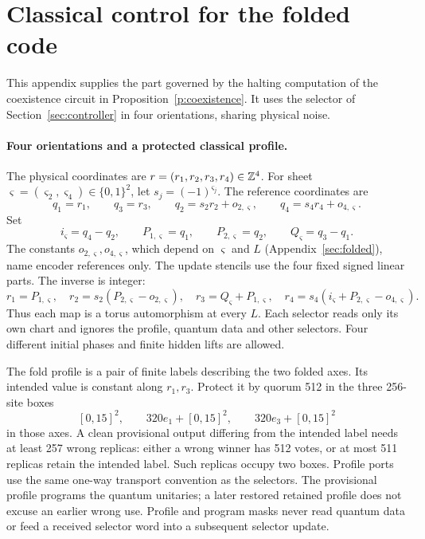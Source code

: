 \section{Classical control for the folded code}\label{sec:fold-controls}
This appendix supplies the part governed by the halting computation of the coexistence circuit
in Proposition~\ref{p:coexistence}. It uses the selector of
Section~\ref{sec:controller} in four orientations, sharing physical noise.

\paragraph{Four orientations and a protected classical profile.}
The physical coordinates are \(r=(r_1,r_2,r_3,r_4)\in\mathbb Z^4\).
For sheet \(\varsigma=(\varsigma_2,\varsigma_4)\in\{0,1\}^2\), let
\(s_j=(-1)^{\varsigma_j}\). The reference coordinates are
\[
 q_1=r_1,\qquad q_3=r_3,\qquad q_2=s_2r_2+o_{2,\varsigma},\qquad q_4=s_4r_4+o_{4,\varsigma}.
\]
Set
\begin{equation}\label{eq:c-orientations}
 i_\varsigma=q_4-q_2,\qquad P_{1,\varsigma}=q_1,\qquad
 P_{2,\varsigma}=q_2,\qquad Q_\varsigma=q_3-q_1.
\end{equation}
The constants \(o_{2,\varsigma},o_{4,\varsigma}\), which depend on \(\varsigma\)
and \(L\) (Appendix~\ref{sec:folded}), name encoder references only. The update
stencils use the four fixed signed linear parts. The inverse is integer:
\[
 r_1=P_{1,\varsigma},\quad r_2=s_2(P_{2,\varsigma}-o_{2,\varsigma}),\quad
 r_3=Q_\varsigma+P_{1,\varsigma},\quad
 r_4=s_4(i_\varsigma+P_{2,\varsigma}-o_{4,\varsigma}).
\]
Thus each map is a torus automorphism at every
\(L\). Each selector reads only its own chart and ignores the profile,
quantum data and other selectors. Four different initial phases and
finite hidden lifts are allowed.

The fold profile is a pair of finite labels describing the two folded
axes. Its intended value is constant along \(r_1,r_3\). Protect it by
quorum 512 in the three 256-site boxes
\[
 [0,15]^2,\qquad320e_1+[0,15]^2,\qquad320e_3+[0,15]^2
\]
in those axes. A clean provisional output differing from the intended
label needs at least 257 wrong replicas: either a wrong winner has 512
votes, or at most 511 replicas retain the intended label. Such replicas
occupy two boxes. Profile ports use the same one-way transport convention
as the selectors. The provisional profile programs the quantum unitaries;
a later restored retained profile does not excuse an earlier wrong use.
Profile and program masks never read quantum data or feed a received
selector word into a subsequent selector update.


